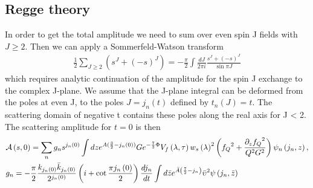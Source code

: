 \documentclass[a4paper,12pt]{article}
\begin{document}
\subsection{Regge theory}
In order to get the total amplitude we need to sum over even spin J fields with $J \geq 2$. Then we can apply a Sommerfeld-Watson transform
\begin{align}
\frac{1}{2} \sum_{J \geq 2} \left(s^J + {\left(-s\right)}^J\right) = - \frac{\pi}{2} \int \frac{d J}{2 \pi i} \frac{s^J + \left(-s\right)^J}{\sin \pi J}
\end{align}
which requires analytic continuation of the amplitude for the spin J exchange to the complex J-plane. We assume that the J-plane integral can be deformed from the poles at even J, to the poles $J = j_n \left(t\right)$ defined by $t_n \left(J\right) = t$. The scattering domain of negative t contains these poles along the real axis for J < 2. The scattering amplitude for $t = 0$ is then
\begin{align}
&\mathcal{A} \left(s, 0 \right) = \sum_n g_n s^{j_n\left(0\right)} \int dz e^{A(\frac{3}{2} - {j_n\left(0\right)})} G e^{-\frac{7}{3} \Phi}  V_f \left( \lambda, \tau \right) {w_s\left(\lambda \right)}^2  \left(  {f_Q}^2 + \frac{{\partial_z f_Q}^2}{Q^2 G^2}  \right) \psi_n \left(j_n, z\right), \\
& g_n = - \frac{\pi}{2} \frac{k_{j_n\left(0\right)} \bar{k}_{j_n\left(0\right)}}{2^{j_n\left(0\right)}}  \left(i + \cot \frac{\pi j_n\left(0\right)}{2} \right) \frac{d j_n}{dt} \int d\bar{z} e^{\bar{A}\left( \frac{7}{2} - j_n \right)}  {\bar{\upsilon}}^2  \psi\left(j_n, \bar{z}\right) \notag
\end{align}
\end{document}
